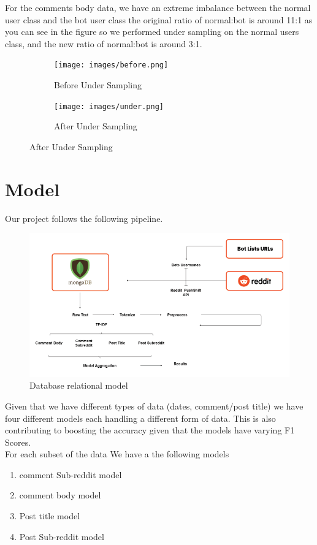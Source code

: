 \documentclass{article}
\begin{document}
For the comments body data, we have an extreme imbalance between the normal user class and the bot user class the original ratio of normal:bot is around 11:1  as you can see in the figure so we performed under sampling on the normal users class, and the new ratio of normal:bot is around 3:1.

    \begin{figure}[H]

        \begin{subfigure}[t]{.5\textwidth}
            \centering
            \texttt{[image: images/before.png]}
                \caption{Before Under Sampling}
            \end{subfigure}
        \hfill
        \begin{subfigure}[t]{.5\textwidth}
            \centering
            \texttt{[image: images/under.png]}
                            \caption{After Under Sampling}
        \end{subfigure}
    \end{figure}

\section{Model}
Our project follows the following pipeline. \par
\begin{figure}[H]
    \centering
    \includegraphics[width=15cm ,keepaspectratio]{pipeline}
    \caption{Database relational model}
\end{figure} 
Given that we have different types of data (dates, comment/post title) we have four different models each handling a different form of data. This is also contributing to boosting the accuracy given that the models have varying F1 Scores.\\
For each subset of the data We have a the following models
\begin{enumerate}
    \item comment Sub-reddit model
    \item comment body model
    \item Post title model
    \item Post Sub-reddit model
\end{enumerate}
    
\end{document}
